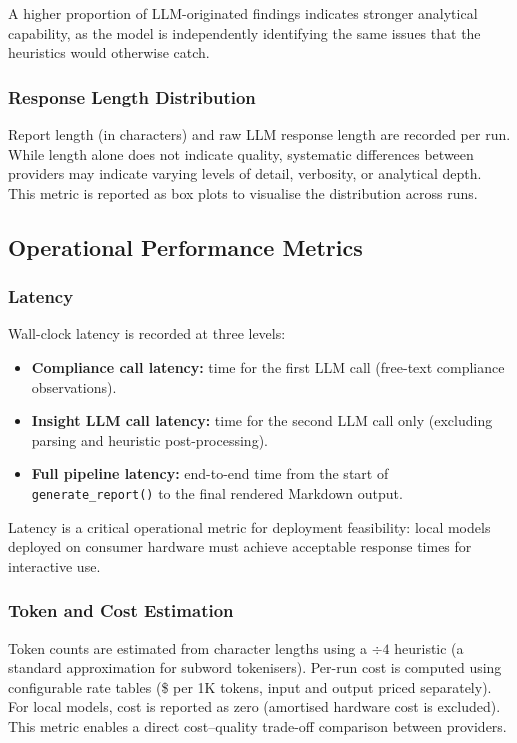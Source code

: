 \documentclass[]{UCD_CS_FYP_Report}
\begin{document}
A higher proportion of LLM-originated findings indicates stronger analytical capability, as the model is independently identifying the same issues that the heuristics would otherwise catch.

\subsubsection{Response Length Distribution}

Report length (in characters) and raw LLM response length are recorded per run. While length alone does not indicate quality, systematic differences between providers may indicate varying levels of detail, verbosity, or analytical depth. This metric is reported as box plots to visualise the distribution across runs.

\subsection{Operational Performance Metrics}

\subsubsection{Latency}

Wall-clock latency is recorded at three levels:
\begin{itemize}
    \item \textbf{Compliance call latency:} time for the first LLM call (free-text compliance observations).
    \item \textbf{Insight LLM call latency:} time for the second LLM call only (excluding parsing and heuristic post-processing).
    \item \textbf{Full pipeline latency:} end-to-end time from the start of \texttt{generate\_report()} to the final rendered Markdown output.
\end{itemize}

Latency is a critical operational metric for deployment feasibility: local models deployed on consumer hardware must achieve acceptable response times for interactive use.

\subsubsection{Token and Cost Estimation}

Token counts are estimated from character lengths using a $\div 4$ heuristic (a standard approximation for subword tokenisers). Per-run cost is computed using configurable rate tables (\$ per 1K tokens, input and output priced separately). For local models, cost is reported as zero (amortised hardware cost is excluded). This metric enables a direct cost--quality trade-off comparison between providers.
\end{document}
